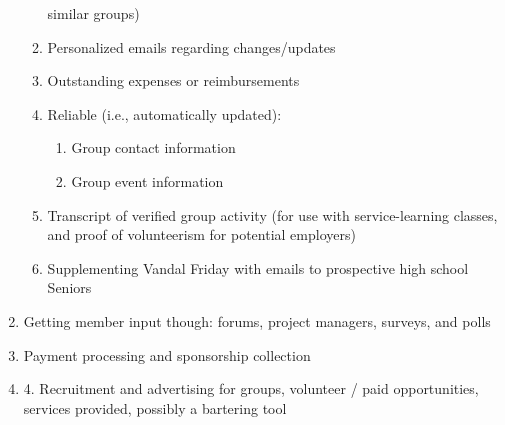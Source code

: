 \begin{enumerate}
\begin{enumerate}
					similar groups)
				\item Personalized emails regarding changes/updates
				\item Outstanding expenses or reimbursements
				\item Reliable (i.e., automatically updated):
				\begin{enumerate}
					\item Group contact information
					\item Group event information
				\end{enumerate}
				\item Transcript of verified group activity (for use with
					service-learning classes, and proof of volunteerism
					for potential employers)
				\item Supplementing Vandal Friday with emails to
					prospective high school Seniors
			\end{enumerate}
			\item Getting member input though: forums, project managers,
				surveys, and polls
			\item Payment processing and sponsorship collection
			\item 4. Recruitment and advertising for groups, volunteer
				/ paid opportunities, services provided, possibly a
				bartering tool
		\end{enumerate}